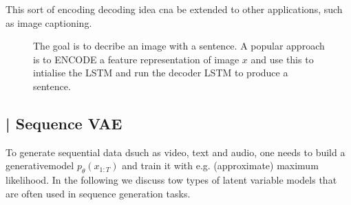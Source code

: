 \documentclass[11pt]{article}
\begin{document}
\begin{figure}[H]
    \centering
\end{figure}

This sort of encoding decoding idea cna be extended to other applications, such as image captioning. 

\begin{figure}[H]
    \centering
    \caption*{The goal is to decribe an image with a sentence. A popular approach is to ENCODE a feature representation of image $x$ and use this to intialise the LSTM and run the decoder LSTM to produce a sentence.}
\end{figure}

\subsection{\color{red}{*Generative models for sequences} | Sequence VAE}

To generate sequential data dsuch as video, text and audio, one needs to build a generativemodel $p_\theta(x_{1:T})$ and train it with e.g. (approximate) maximum likelihood. In the following we discuss tow types of latent variable models that are often used in sequence generation tasks.
\end{document}
